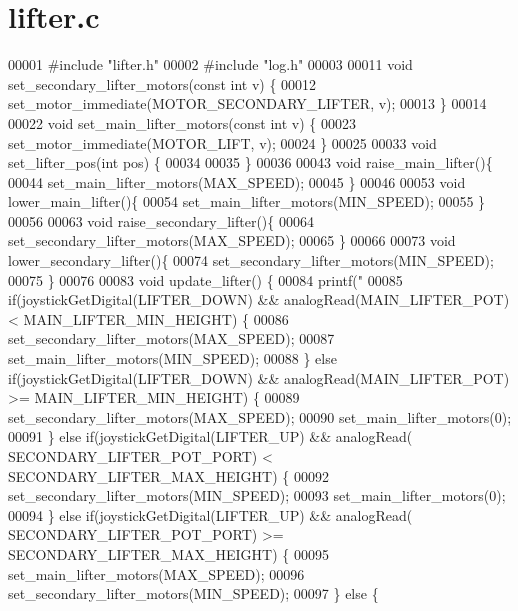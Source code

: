 \section{lifter.\+c}
\label{lifter_8c_source}

\begin{DoxyCode}
00001 \textcolor{preprocessor}{#include "lifter.h"}
00002 \textcolor{preprocessor}{#include "log.h"}
00003 
00011 \textcolor{keywordtype}{void} set_secondary_lifter_motors(\textcolor{keyword}{const} \textcolor{keywordtype}{int} v) \{
00012   set_motor_immediate(MOTOR_SECONDARY_LIFTER, v);
00013 \}
00014 
00022 \textcolor{keywordtype}{void} set_main_lifter_motors(\textcolor{keyword}{const} \textcolor{keywordtype}{int} v) \{
00023   set_motor_immediate(MOTOR_LIFT, v);
00024 \}
00025 
00033 \textcolor{keywordtype}{void} set_lifter_pos(\textcolor{keywordtype}{int} pos) \{
00034 
00035 \}
00036 
00043 \textcolor{keywordtype}{void} raise_main_lifter()\{
00044   set_main_lifter_motors(MAX_SPEED);
00045 \}
00046 
00053 \textcolor{keywordtype}{void} lower_main_lifter()\{
00054   set_main_lifter_motors(MIN_SPEED);
00055 \}
00056 
00063 \textcolor{keywordtype}{void} raise_secondary_lifter()\{
00064   set_secondary_lifter_motors(MAX_SPEED);
00065 \}
00066 
00073 \textcolor{keywordtype}{void} lower_secondary_lifter()\{
00074   set_secondary_lifter_motors(MIN_SPEED);
00075 \}
00076 
00083 \textcolor{keywordtype}{void} update_lifter() \{
00084   printf(\textcolor{stringliteral}{"%
00085   \textcolor{keywordflow}{if}(joystickGetDigital(LIFTER_DOWN) && analogRead(MAIN_LIFTER_POT) < 
      MAIN_LIFTER_MIN_HEIGHT) \{
00086     set_secondary_lifter_motors(MAX_SPEED);
00087     set_main_lifter_motors(MIN_SPEED);
00088   \} \textcolor{keywordflow}{else} \textcolor{keywordflow}{if}(joystickGetDigital(LIFTER_DOWN) && analogRead(MAIN_LIFTER_POT) >= 
      MAIN_LIFTER_MIN_HEIGHT) \{
00089     set_secondary_lifter_motors(MAX_SPEED);
00090     set_main_lifter_motors(0);
00091   \} \textcolor{keywordflow}{else} \textcolor{keywordflow}{if}(joystickGetDigital(LIFTER_UP) && analogRead(
      SECONDARY_LIFTER_POT_PORT) < SECONDARY_LIFTER_MAX_HEIGHT) \{
00092     set_secondary_lifter_motors(MIN_SPEED);
00093     set_main_lifter_motors(0);
00094   \} \textcolor{keywordflow}{else} \textcolor{keywordflow}{if}(joystickGetDigital(LIFTER_UP) && analogRead(
      SECONDARY_LIFTER_POT_PORT) >= SECONDARY_LIFTER_MAX_HEIGHT) \{
00095     set_main_lifter_motors(MAX_SPEED);
00096     set_secondary_lifter_motors(MIN_SPEED);
00097   \} \textcolor{keywordflow}{else} \{
}
\end{DoxyCode}
